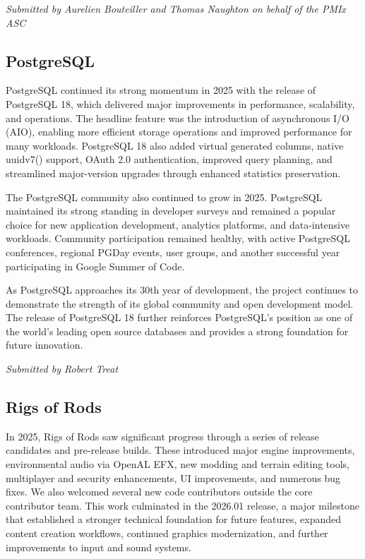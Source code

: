 \documentclass[a4paper]{report}
\begin{document}
{\em Submitted by Aurelien Bouteiller and Thomas Naughton on behalf of the PMIx ASC}

\subsection{PostgreSQL}

PostgreSQL continued its strong momentum in 2025 with the release of PostgreSQL 18, which delivered major improvements in performance, scalability, and operations. The headline feature was the introduction of asynchronous I/O (AIO), enabling more efficient storage operations and improved performance for many workloads. PostgreSQL 18 also added virtual generated columns, native uuidv7() support, OAuth 2.0 authentication, improved query planning, and streamlined major-version upgrades through enhanced statistics preservation.

The PostgreSQL community also continued to grow in 2025. PostgreSQL maintained its strong standing in developer surveys and remained a popular choice for new application development, analytics platforms, and data-intensive workloads. Community participation remained healthy, with active PostgreSQL conferences, regional PGDay events, user groups, and another successful year participating in Google Summer of Code.

As PostgreSQL approaches its 30th year of development, the project continues to demonstrate the strength of its global community and open development model. The release of PostgreSQL 18 further reinforces PostgreSQL's position as one of the world's leading open source databases and provides a strong foundation for future innovation.

{\em Submitted by Robert Treat}

\subsection{Rigs of Rods}

In 2025, Rigs of Rods saw significant progress through a series of release candidates and pre-release builds. These introduced major engine improvements, environmental audio via OpenAL EFX, new modding and terrain editing tools, multiplayer and security enhancements, UI improvements, and numerous bug fixes. We also welcomed several new code contributors outside the core contributor team. This work culminated in the 2026.01 release, a major milestone that established a stronger technical foundation for future features, expanded content creation workflows, continued graphics modernization, and further improvements to input and sound systems.
\end{document}
